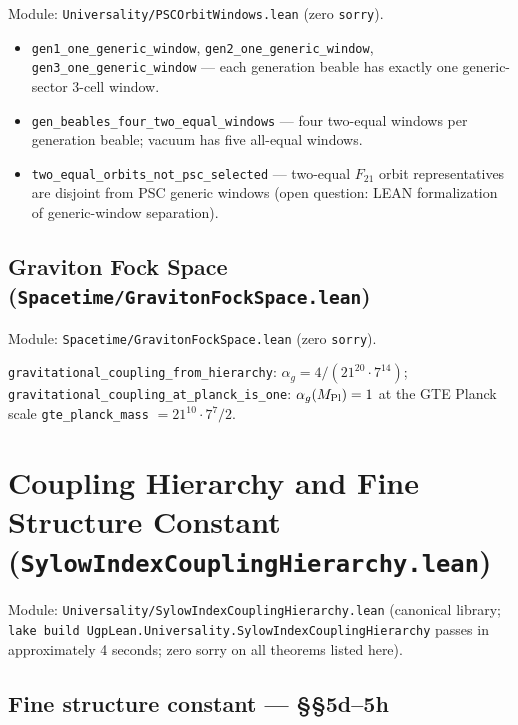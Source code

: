 \documentclass[11pt,a4paper]{article}
\newenvironment{keybox}[1]{%
  \Needspace*{8\baselineskip}%
  \begin{tcolorbox}[
    enhanced,
    breakable=false,
    colback=blue!5,
    colframe=blue!45!black,
    coltitle=black,
    colbacktitle=blue!14,
    boxrule=0.85pt,
    arc=2.5pt,
    left=9pt, right=9pt, top=6pt, bottom=6pt,
    titlerule=0.55pt,
    fonttitle=\bfseries,
    title={#1},
    before upper=\raggedright,
    before skip=0.9\baselineskip,
    after skip=0.9\baselineskip
  ]%
}{%
  \end{tcolorbox}%
}
\theoremstyle{definition}
\begin{document}
Module: \texttt{Universality/PSCOrbitWindows.lean} (zero \lstinline|sorry|).

\begin{itemize}[nosep]
\item \lstinline|gen1_one_generic_window|, \lstinline|gen2_one_generic_window|,
  \lstinline|gen3_one_generic_window| --- each generation beable has exactly one
  generic-sector 3-cell window.
\item \lstinline|gen_beables_four_two_equal_windows| --- four two-equal windows per
  generation beable; vacuum has five all-equal windows.
\item \lstinline|two_equal_orbits_not_psc_selected| --- two-equal $F_{21}$ orbit
  representatives are disjoint from PSC generic windows (open question: LEAN formalization of generic-window separation).
\end{itemize}

\subsection{Graviton Fock Space
  (\texttt{Spacetime/\allowbreak GravitonFockSpace.lean})}\label{subsec:graviton-fock}

Module: \texttt{Spacetime/GravitonFockSpace.lean} (zero \lstinline|sorry|).

\begin{keybox}{GTE gravitational coupling (zero \texttt{sorry})}
\lstinline|gravitational_coupling_from_hierarchy|:
$\alpha_g = 4/(21^{20}\cdot 7^{14})$;
\lstinline|gravitational_coupling_at_planck_is_one|:
$\alpha_g(M_{\rm Pl})=1$ at the GTE Planck scale
\lstinline|gte_planck_mass| $= 21^{10}\cdot 7^7/2$.
\end{keybox}

\section{Coupling Hierarchy and Fine Structure Constant
  (\texttt{SylowIndexCouplingHierarchy.lean})}\label{sec:coupling-hierarchy}

Module: \texttt{Universality/SylowIndexCouplingHierarchy.lean}
(canonical library; \texttt{lake build UgpLean.Universality.SylowIndexCouplingHierarchy}
passes in approximately 4 seconds; zero sorry on all theorems listed here).

\subsection{Fine structure constant — §§5d–5h}\label{subsec:alpha-em-sections}
\end{document}
